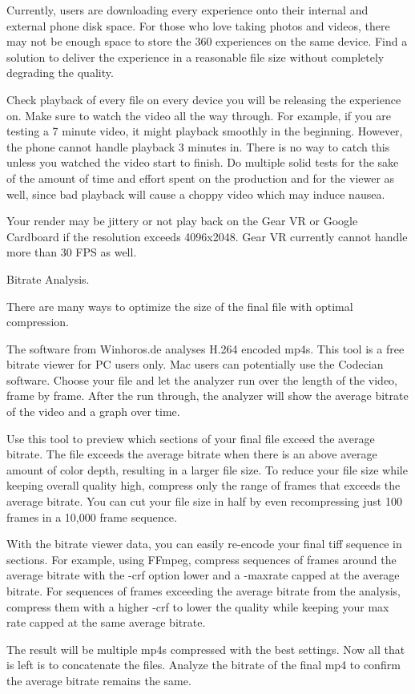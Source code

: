 \begin{fullwidth}
Currently, users are downloading every experience onto their internal and external phone disk space. For those who love taking photos and videos, there may not be enough space to store the 360 experiences on the same device. Find a solution to deliver the experience in a reasonable file size without completely degrading the quality.

Check playback of every file on every device you will be releasing the experience on. Make sure to watch the video all the way through. For example, if you are testing a 7 minute video, it might playback smoothly in the beginning. However, the phone cannot handle playback 3 minutes in. There is no way to catch this unless you watched the video start to finish. Do multiple solid tests for the sake of the amount of time and effort spent on the production and for the viewer as well, since bad playback will cause a choppy video which may induce nausea. 

\tip Your render may be jittery or not play back on the Gear VR or Google Cardboard if the resolution exceeds 4096x2048. Gear VR currently cannot handle more than 30 FPS as well.

{\large Bitrate Analysis. \par}

There are many ways to optimize the size of the final file with optimal compression. 

The software from Winhoros.de analyses H.264 encoded mp4s. This tool is a free bitrate viewer for PC users only. Mac users can potentially use the Codecian software. Choose your file and let the analyzer run over the length of the video, frame by frame. After the run through, the analyzer will show the average bitrate of the video and a graph over time. 

Use this tool to preview which sections of your final file exceed the average bitrate. The file exceeds the average bitrate when there is an above average amount of color depth, resulting in a larger file size. To reduce your file size while keeping overall quality high, compress only the range of frames that exceeds the average bitrate. You can cut your file size in half by even recompressing just 100 frames in a 10,000 frame sequence.

With the bitrate viewer data, you can easily re-encode your final tiff sequence in sections. For example, using FFmpeg, compress sequences of frames around the average bitrate with the -crf option lower and a -maxrate capped at the average bitrate. For sequences of frames exceeding the average bitrate from the analysis, compress them with a higher -crf to lower the quality while keeping your max rate capped at the same average bitrate.

The result will be multiple mp4s compressed with the best settings. Now all that is left is to concatenate the files. Analyze the bitrate of the final mp4 to confirm the average bitrate remains the same.


\clearpage
\end{fullwidth}